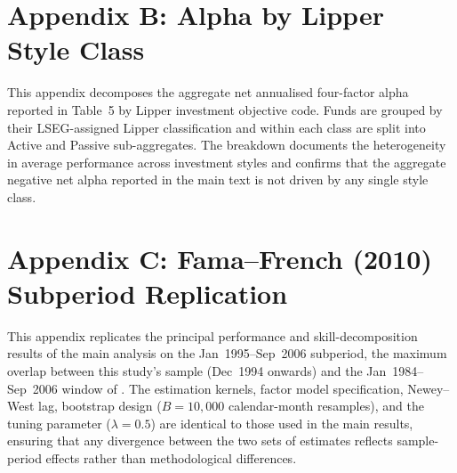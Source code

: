 \documentclass[12pt]{article}
\begin{document}





\clearpage
\section*{Appendix B: Alpha by Lipper Style Class}
\label{app:lipper}
\setcounter{table}{0}
\renewcommand{\thetable}{B.\arabic{table}}
\setcounter{figure}{0}
\renewcommand{\thefigure}{B.\arabic{figure}}

This appendix decomposes the aggregate net annualised \textcite{Carhart1997}
four-factor alpha reported in Table~5 by Lipper investment objective code.
Funds are grouped by their LSEG-assigned Lipper classification and within each
class are split into Active and Passive sub-aggregates. The breakdown documents
the heterogeneity in average performance across investment styles and confirms
that the aggregate negative net alpha reported in the main text is not driven
by any single style class.




\clearpage
\section*{Appendix C: Fama--French (2010) Subperiod Replication}
\label{app:ff_subperiod}
\setcounter{table}{0}
\renewcommand{\thetable}{C.\arabic{table}}
\setcounter{figure}{0}
\renewcommand{\thefigure}{C.\arabic{figure}}

This appendix replicates the principal performance and skill-decomposition
results of the main analysis on the Jan~1995--Sep~2006 subperiod, the maximum
overlap between this study's sample (Dec~1994 onwards) and the
Jan~1984--Sep~2006 window of \textcite{FamaFrench2010}. The estimation kernels,
factor model specification, Newey--West lag, bootstrap design ($B = 10{,}000$
calendar-month resamples), and the \textcite{Storey2002} tuning parameter
($\lambda = 0.5$) are identical to those used in the main results, ensuring
that any divergence between the two sets of estimates reflects sample-period
effects rather than methodological differences.
\end{document}
